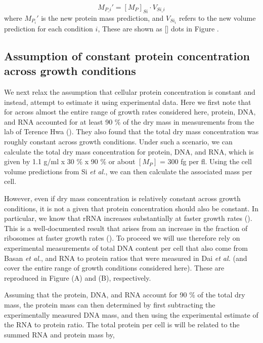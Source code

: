 \begin{equation}
	M_{P\_i}' = [M_P]_{Si} \cdot V_{Si\_i}
\end{equation}
where $M_{P_i}'$ is the new protein mass prediction, and $V_{Si_i}$ refers to
the new volume prediction for each condition $i$, These are shown as [] dots in
Figure .


\subsection{Assumption of constant protein concentration across growth conditions}
\label{sec:estimate_protein_per_cell}
We next relax the assumption that cellular protein concentration is constant and
instead, attempt to  estimate it using experimental data. Here we first note
that  for across almost the entire range of growth rates considered here,
protein, DNA, and RNA accounted for at least 90 \% of the dry mass in
measurements from the lab of Terence Hwa (\cite{basan2015}). They also found that
the total dry mass concentration was roughly constant across growth conditions.
Under such a scenario, we can calculate the total dry mass concentration for
protein, DNA, and RNA, which is given by 1.1 g/ml x 30 \% x 90 \% or about
$[M_P]$ = 300 fg per fl. Using the cell volume predictions from Si \textit{et
al.}, we can then calculate the associated mass per cell.

However, even if dry mass concentration is relatively constant across growth
conditions, it is not a given that protein concentration should also be
constant. In particular, we know that rRNA increases substantially at faster
growth rates (\cite{dai2016}). This is a well-documented result that arises from
an increase in the fraction of ribosomes at faster growth rates
(\cite{scott2010}). To proceed we will use therefore rely on experimental
measurements of total DNA content per cell that also come from Basan \textit{et
al.}, and RNA to protein ratios that were measured in Dai \textit{et al.} (and
cover the entire range of growth conditions considered here). These are
reproduced in Figure (A) and (B),
respectively.

Assuming that the protein, DNA, and RNA account for 90 \% of the total dry mass,
the protein mass can then determined by first subtracting the experimentally
measured DNA mass,  and then using the experimental estimate of the RNA to
protein ratio. The total protein per cell is will be related to the summed RNA
and protein mass by,

